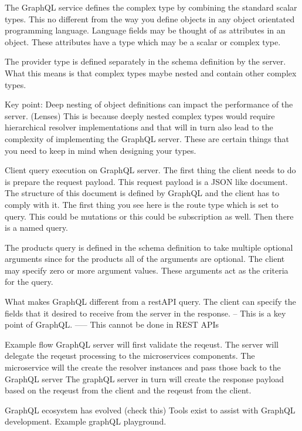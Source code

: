 \documentclass[a4paper, 11pt]{book}
\begin{document}
    The GraphQL service defines the complex type by combining the standard scalar types.
    This no different from the way you define objects in any object orientated programming language.
    Language fields may be thought of as attributes in an object.
    These attributes have a type which may be a scalar or complex type.


    The provider type is defined separately in the schema definition by the server.
    What this means is that complex types maybe nested and contain other complex types.

    Key point: Deep nesting of object definitions can impact the performance of the server. (Lenses)
    This is because deeply nested complex types would require hierarchical resolver implementations and that will in turn also lead to the complexity of implementing the GraphQL server.
    These are certain things that you need to keep in mind when designing your types.

    Client query execution on GraphQL server.
    The first thing the client needs to do is prepare the request payload.
    This request payload is a JSON like document.
    The structure of this document is defined by GraphQL and the client has to comply with it.
    The first thing you see here is the route type which is set to query.
    This could be mutations or this could be subscription as well.
    Then there is a named query.

    The products query is defined in the schema definition to take multiple optional arguments since for the products all of the arguments are optional.
    The client may specify zero or more argument values.
    These arguments act as the criteria for the query.

    What makes GraphQL different from a restAPI query.
    The client can specify the fields that it desired to receive from the server in the response.
    -- This is a key point of GraphQL.
    ----- This cannot be done in REST APIs

    Example flow
    GraphQL server will first validate the reqeust.
    The server will delegate the reqeust processing to the microservices components.
    The microservice will the create the resolver instances and pass those back to the GraphQL server
    The graphQL server in turn will create the response payload based on the reqeust from the client and the reqeust from the client.

    GraphQL ecosystem has evolved (check this)
    Tools exist to assist with GraphQL development.
    Example graphQL playground.
\end{document}
